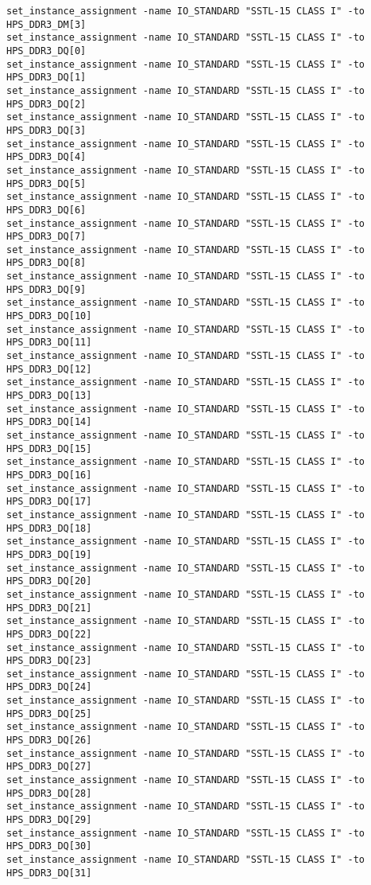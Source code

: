 \documentclass[dvipdfm]{book}
\begin{document}
\begin{verbatim}
set_instance_assignment -name IO_STANDARD "SSTL-15 CLASS I" -to HPS_DDR3_DM[3]
set_instance_assignment -name IO_STANDARD "SSTL-15 CLASS I" -to HPS_DDR3_DQ[0]
set_instance_assignment -name IO_STANDARD "SSTL-15 CLASS I" -to HPS_DDR3_DQ[1]
set_instance_assignment -name IO_STANDARD "SSTL-15 CLASS I" -to HPS_DDR3_DQ[2]
set_instance_assignment -name IO_STANDARD "SSTL-15 CLASS I" -to HPS_DDR3_DQ[3]
set_instance_assignment -name IO_STANDARD "SSTL-15 CLASS I" -to HPS_DDR3_DQ[4]
set_instance_assignment -name IO_STANDARD "SSTL-15 CLASS I" -to HPS_DDR3_DQ[5]
set_instance_assignment -name IO_STANDARD "SSTL-15 CLASS I" -to HPS_DDR3_DQ[6]
set_instance_assignment -name IO_STANDARD "SSTL-15 CLASS I" -to HPS_DDR3_DQ[7]
set_instance_assignment -name IO_STANDARD "SSTL-15 CLASS I" -to HPS_DDR3_DQ[8]
set_instance_assignment -name IO_STANDARD "SSTL-15 CLASS I" -to HPS_DDR3_DQ[9]
set_instance_assignment -name IO_STANDARD "SSTL-15 CLASS I" -to HPS_DDR3_DQ[10]
set_instance_assignment -name IO_STANDARD "SSTL-15 CLASS I" -to HPS_DDR3_DQ[11]
set_instance_assignment -name IO_STANDARD "SSTL-15 CLASS I" -to HPS_DDR3_DQ[12]
set_instance_assignment -name IO_STANDARD "SSTL-15 CLASS I" -to HPS_DDR3_DQ[13]
set_instance_assignment -name IO_STANDARD "SSTL-15 CLASS I" -to HPS_DDR3_DQ[14]
set_instance_assignment -name IO_STANDARD "SSTL-15 CLASS I" -to HPS_DDR3_DQ[15]
set_instance_assignment -name IO_STANDARD "SSTL-15 CLASS I" -to HPS_DDR3_DQ[16]
set_instance_assignment -name IO_STANDARD "SSTL-15 CLASS I" -to HPS_DDR3_DQ[17]
set_instance_assignment -name IO_STANDARD "SSTL-15 CLASS I" -to HPS_DDR3_DQ[18]
set_instance_assignment -name IO_STANDARD "SSTL-15 CLASS I" -to HPS_DDR3_DQ[19]
set_instance_assignment -name IO_STANDARD "SSTL-15 CLASS I" -to HPS_DDR3_DQ[20]
set_instance_assignment -name IO_STANDARD "SSTL-15 CLASS I" -to HPS_DDR3_DQ[21]
set_instance_assignment -name IO_STANDARD "SSTL-15 CLASS I" -to HPS_DDR3_DQ[22]
set_instance_assignment -name IO_STANDARD "SSTL-15 CLASS I" -to HPS_DDR3_DQ[23]
set_instance_assignment -name IO_STANDARD "SSTL-15 CLASS I" -to HPS_DDR3_DQ[24]
set_instance_assignment -name IO_STANDARD "SSTL-15 CLASS I" -to HPS_DDR3_DQ[25]
set_instance_assignment -name IO_STANDARD "SSTL-15 CLASS I" -to HPS_DDR3_DQ[26]
set_instance_assignment -name IO_STANDARD "SSTL-15 CLASS I" -to HPS_DDR3_DQ[27]
set_instance_assignment -name IO_STANDARD "SSTL-15 CLASS I" -to HPS_DDR3_DQ[28]
set_instance_assignment -name IO_STANDARD "SSTL-15 CLASS I" -to HPS_DDR3_DQ[29]
set_instance_assignment -name IO_STANDARD "SSTL-15 CLASS I" -to HPS_DDR3_DQ[30]
set_instance_assignment -name IO_STANDARD "SSTL-15 CLASS I" -to HPS_DDR3_DQ[31]

\end{verbatim}
\end{document}
